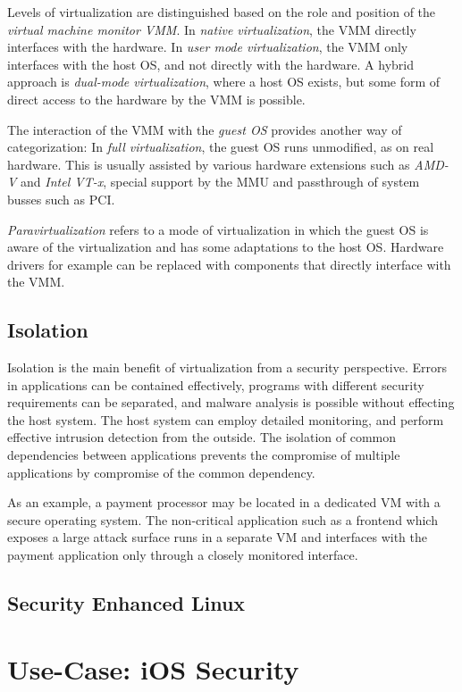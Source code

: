Levels of virtualization are distinguished based on the role and position of the
\emph{virtual machine monitor VMM}. In \emph{native virtualization}, the VMM
directly interfaces with the hardware. In \emph{user mode virtualization}, the
VMM only interfaces with the host OS, and not directly with the hardware. A
hybrid approach is \emph{dual-mode virtualization}, where a host OS exists, but
some form of direct access to the hardware by the VMM is possible.

The interaction of the VMM with the \emph{guest OS} provides another way of
categorization: In \emph{full virtualization}, the guest OS runs unmodified, as
on real hardware. This is usually assisted by various hardware extensions such
as \textit{AMD-V} and \textit{Intel VT-x}, special support by the MMU and
passthrough of system busses such as PCI.

\emph{Paravirtualization} refers to a mode of virtualization in which the guest
OS is aware of the virtualization and has some adaptations to the host OS.
Hardware drivers for example can be replaced with components that directly
interface with the VMM.

\subsection{Isolation}
Isolation is the main benefit of virtualization from a security perspective.
Errors in applications can be contained effectively, programs with different
security requirements can be separated, and malware analysis is possible without
effecting the host system. The host system can employ detailed monitoring, and
perform effective intrusion detection from the outside. The isolation of common
dependencies between applications prevents the compromise of multiple
applications by compromise of the common dependency.

As an example, a payment processor may be located in a dedicated VM with a
secure operating system. The non-critical application such as a frontend which
exposes a large attack surface runs in a separate VM and interfaces with the
payment application only through a closely monitored interface.

\subsection{Security Enhanced Linux}

\section{Use-Case: iOS Security}
